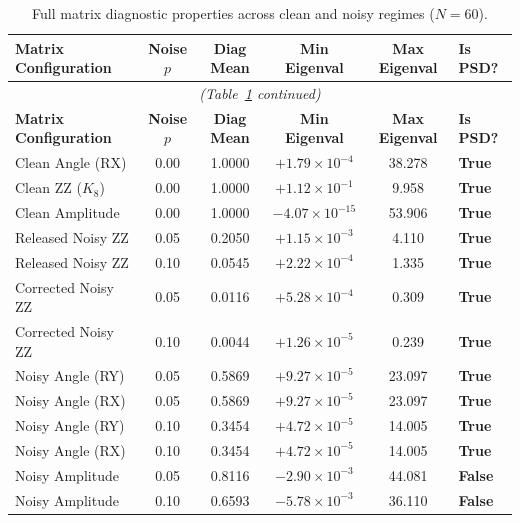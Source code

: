 \begin{longtable}{p{4.5cm}ccccp{2.5cm}}
\caption{Full matrix diagnostic properties across clean and noisy regimes ($N=60$).}\label{tab:app-gram-checks}\\
\toprule
\textbf{Matrix Configuration} & \textbf{Noise $p$} & \textbf{Diag Mean} & \textbf{Min Eigenval} & \textbf{Max Eigenval} & \textbf{Is PSD?} \\
\midrule
\endfirsthead
\multicolumn{6}{c}{\small\itshape (Table~\ref{tab:app-gram-checks} continued)}\\
\toprule
\textbf{Matrix Configuration} & \textbf{Noise $p$} & \textbf{Diag Mean} & \textbf{Min Eigenval} & \textbf{Max Eigenval} & \textbf{Is PSD?} \\
\midrule
\endhead
\bottomrule
\endlastfoot

Clean Angle (RX)      & 0.00 & 1.0000 & $+1.79 \times 10^{-4}$  & 38.278 & \textbf{True} \\
Clean ZZ ($K_8$)      & 0.00 & 1.0000 & $+1.12 \times 10^{-1}$  & 9.958  & \textbf{True} \\
Clean Amplitude       & 0.00 & 1.0000 & $-4.07 \times 10^{-15}$ & 53.906 & \textbf{True} \\
Released Noisy ZZ     & 0.05 & 0.2050 & $+1.15 \times 10^{-3}$  & 4.110  & \textbf{True} \\
Released Noisy ZZ     & 0.10 & 0.0545 & $+2.22 \times 10^{-4}$  & 1.335  & \textbf{True} \\
Corrected Noisy ZZ    & 0.05 & 0.0116 & $+5.28 \times 10^{-4}$  & 0.309  & \textbf{True} \\
Corrected Noisy ZZ    & 0.10 & 0.0044 & $+1.26 \times 10^{-5}$  & 0.239  & \textbf{True} \\
Noisy Angle (RY)      & 0.05 & 0.5869 & $+9.27 \times 10^{-5}$  & 23.097 & \textbf{True} \\
Noisy Angle (RX)      & 0.05 & 0.5869 & $+9.27 \times 10^{-5}$  & 23.097 & \textbf{True} \\
Noisy Angle (RY)      & 0.10 & 0.3454 & $+4.72 \times 10^{-5}$  & 14.005 & \textbf{True} \\
Noisy Angle (RX)      & 0.10 & 0.3454 & $+4.72 \times 10^{-5}$  & 14.005 & \textbf{True} \\
Noisy Amplitude       & 0.05 & 0.8116 & $-2.90 \times 10^{-3}$  & 44.081 & \textbf{False} \\
Noisy Amplitude       & 0.10 & 0.6593 & $-5.78 \times 10^{-3}$  & 36.110 & \textbf{False} \\
\end{longtable}

